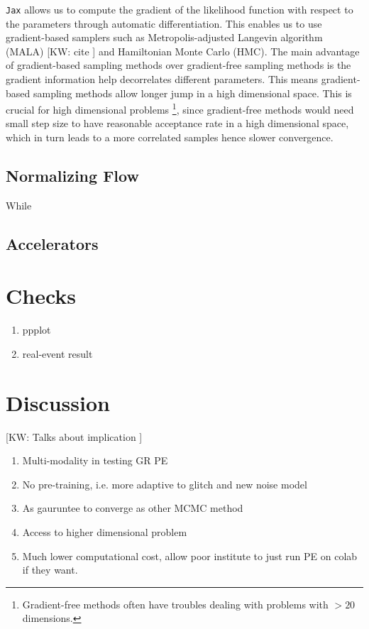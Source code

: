 \documentclass[twocolumn]{aastex631}
\newcommand{\kw}[1]{{\color{rb4}[KW: #1 ]}}
\begin{document}
\texttt{Jax} allows us to compute the gradient of the likelihood function with respect to the parameters through automatic differentiation.
This enables us to use gradient-based samplers such as Metropolis-adjusted Langevin algorithm (MALA) \kw{cite} and Hamiltonian Monte Carlo (HMC)\cite{kw}.
The main advantage of gradient-based sampling methods over gradient-free sampling methods is the gradient information help decorrelates different parameters.
This means gradient-based sampling methods allow longer jump in a high dimensional space.
This is crucial for high dimensional problems \footnote{Gradient-free methods often have troubles dealing with problems with $>20$ dimensions.},
since gradient-free methods would need small step size to have reasonable acceptance rate in a high dimensional space,
which in turn leads to a more correlated samples hence slower convergence.

\subsection{Normalizing Flow}
\label{sec:flow}

While 

\subsection{Accelerators}
\label{sec:accelerators}


\section{Checks}

\begin{enumerate}
    \item ppplot
    \item real-event result
\end{enumerate}


\section{Discussion}

\kw{Talks about implication}
\begin{enumerate}
    \item Multi-modality in testing GR PE
    \item No pre-training, i.e. more adaptive to glitch and new noise model
    \item As gauruntee to converge as other MCMC method
    \item Access to higher dimensional problem
    \item Much lower computational cost, allow poor institute to just run PE on colab if they want.
\end{enumerate}
\end{document}
